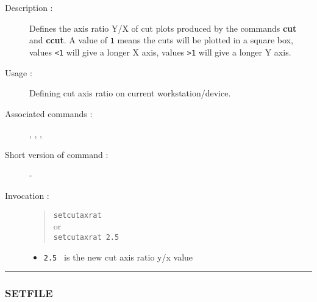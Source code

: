 \begin{description}

\item[Description :] Defines the axis ratio Y/X of cut plots produced
by the commands {\bf cut} and {\bf ccut}.  A value of {\tt 1} means the
cuts will be plotted in a square box, values \verb+<1+ will give a
longer X axis, values \verb+>1+  will give a longer Y axis.

\item[Usage :] Defining cut axis ratio on current workstation/device.

\item[Associated commands :] {\tt {}},
{\tt {}}, {\tt {}},
{\tt {}}

\item[Short version of command :] -
\item[Invocation :]

\begin{quote}{\tt  setcutaxrat }\\
or \\
{\tt setcutaxrat 2.5 }
\end{quote}

\begin{itemize}

\item {\tt 2.5 } is the new cut axis ratio y/x value
\end{itemize}

\end{description}

\hrule
\subsubsection*{\label{SETFILE}SETFILE}

